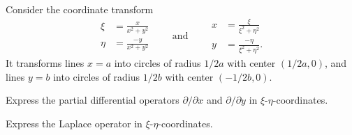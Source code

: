 Consider the coordinate transform
\[
\begin{aligned}
\xi  &= \frac{x}{x^2+y^2} \\
\eta &= \frac{-y}{x^2+y^2}
\end{aligned}
\qquad\text{and}\qquad
\begin{aligned}
x &= \frac{\xi}{\xi^2+\eta^2} \\
y &= \frac{-\eta}{\xi^2+\eta^2}.
\end{aligned}
\]
It transforms lines $x=a$ into circles of radius $1/2a$ with center
$(1/2a,0)$,
and lines $y=b$ into circles of radius $1/2b$ with center $(-1/2b,0)$.
\begin{teilaufgaben}
\item Express the partial differential operators $\partial/\partial x$ and
$\partial/\partial y$ in $\xi$-$\eta$-coordinates.
\item Express the Laplace operator in $\xi$-$\eta$-coordinates.
\end{teilaufgaben}

